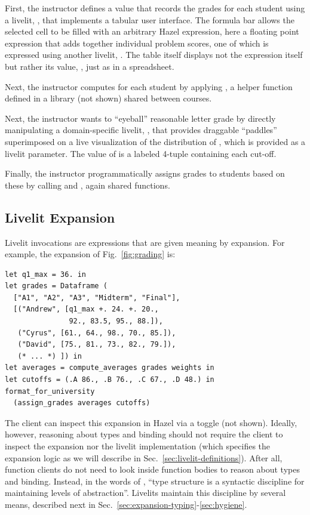 First, the instructor defines a value 
that records the grades for each student using a livelit, ,
that implements a tabular user interface. The formula bar
allows the selected cell to be filled with an arbitrary Hazel expression,
here a floating point expression that adds together individual problem scores,
one of which is expressed using another livelit,
.
The table itself displays not the expression itself but rather its value, , just as in a spreadsheet.

Next, the instructor computes 
for each student by applying , a helper function
defined in a library  (not shown) shared between courses.

Next, the instructor wants to ``eyeball'' reasonable letter grade  
by directly manipulating a domain-specific livelit, , that provides draggable ``paddles''
superimposed on a live visualization of the distribution of , 
which is provided as a livelit parameter.
The value of  is a labeled 4-tuple containing each cut-off.

Finally,
the instructor programmatically assigns grades to students
based on these 
by calling 
and ,
again shared functions.

\subsection{Livelit Expansion}\label{sec:livelit-expansion}
Livelit invocations are expressions 
that are given meaning by expansion.
For example, the expansion of Fig.~\ref{fig:grading} is:

\begin{lstlisting}[xleftmargin=0.2cm]
let q1_max = 36. in 
let grades = Dataframe (
  ["A1", "A2", "A3", "Midterm", "Final"],
  [("Andrew", [q1_max +. 24. +. 20.,
               92., 83.5, 95., 88.]),
   ("Cyrus", [61., 64., 98., 70., 85.]),
   ("David", [75., 81., 73., 82., 79.]),
   (* ... *) ]) in
let averages = compute_averages grades weights in
let cutoffs = (.A 86., .B 76., .C 67., .D 48.) in
format_for_university
  (assign_grades averages cutoffs)
\end{lstlisting}

The client can inspect this expansion in Hazel via a toggle (not shown).
Ideally, however, reasoning about types and binding
should not require the client to inspect the expansion
nor the livelit implementation (which specifies the expansion logic
as we will describe in Sec.~\ref{sec:livelit-definitions}).
After all, function clients do not need to look inside
function bodies to reason about types and binding.
Instead, in the words of \citet{DBLP:conf/ifip/Reynolds83},
``type structure is a syntactic discipline for maintaining levels of abstraction''.
Livelits maintain this discipline by
several means, described next in Sec.~\ref{sec:expansion-typing}-\ref{sec:hygiene}.

